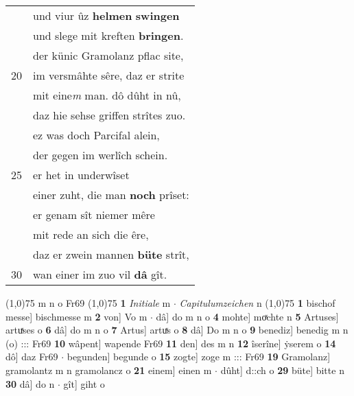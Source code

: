 \documentclass[8pt,a4paper,notitlepage]{article}
\begin{document}
\begin{table}[ht]
\begin{minipage}[t]{0.5\linewidth}
\begin{tabular}{rl}
 & und viur ûz \textbf{helmen} \textbf{swingen}\\ 
 & und slege mit kreften \textbf{bringen}.\\ 
 & der künic Gramolanz pflac site,\\ 
20 & im versmâhte sêre, daz er strite\\ 
 & mit eine\textit{m} man. dô dûht in nû,\\ 
 & daz hie sehse griffen strîtes zuo.\\ 
 & ez was doch Parcifal alein,\\ 
 & der gegen im werlîch schein.\\ 
25 & er het in underwîset\\ 
 & einer zuht, die man \textbf{noch} prîset:\\ 
 & er genam sît niemer mêre\\ 
 & mit rede an sich die êre,\\ 
 & daz er zwein mannen \textbf{büte} strît,\\ 
30 & wan einer im zuo vil \textbf{dâ} gît.\\ 
\end{tabular}
\scriptsize
\line(1,0){75} \newline
m n o Fr69 \newline
\line(1,0){75} \newline
\textbf{1} \textit{Initiale} m   $\cdot$ \textit{Capitulumzeichen} n  \newline
\line(1,0){75} \newline
\textbf{1} bischof messe] bischmesse m \textbf{2} von] Vo m  $\cdot$ dâ] do m n o \textbf{4} mohte] moͯchte n \textbf{5} Artuses] artuͯses o \textbf{6} dâ] do m n o \textbf{7} Artus] artuͯs o \textbf{8} dâ] Do m n o \textbf{9} benediz] benedig m n (o) ::: Fr69 \textbf{10} wâpent] wapende Fr69 \textbf{11} den] des m n \textbf{12} îserîne] ẏserem o \textbf{14} dô] daz Fr69  $\cdot$ begunden] begunde o \textbf{15} zogte] zoge m ::: Fr69 \textbf{19} Gramolanz] gramolantz m n gramolancz o \textbf{21} einem] einen m  $\cdot$ dûht] d::ch o \textbf{29} büte] bitte n \textbf{30} dâ] do n  $\cdot$ gît] giht o \newline
\end{minipage}
\end{table}
\newpage
\end{document}
